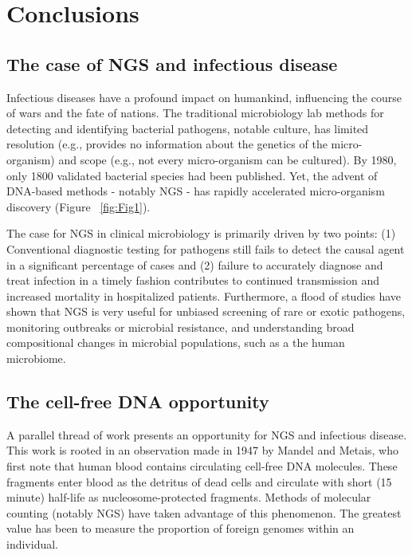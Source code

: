 
\chapter{Conclusions}

\section{The case of NGS and infectious disease}

Infectious diseases have a profound impact on humankind, influencing the course of wars and the fate of nations. The traditional microbiology lab methods for detecting and identifying bacterial pathogens, notable culture, has limited resolution (e.g., provides no information about the genetics of the micro-organism) and scope (e.g., not every micro-organism can be cultured). By 1980, only 1800 validated bacterial species had been published. Yet, the advent of DNA-based methods - notably NGS - has rapidly accelerated micro-organism discovery (Figure ~\ref{fig:Fig1}).

The case for NGS in clinical microbiology is primarily driven by two points: (1) Conventional diagnostic testing for pathogens still fails to detect the causal agent in a significant percentage of cases \cite{Naccache:2014gka} and (2) failure to accurately diagnose and treat infection in a timely fashion contributes to continued transmission and increased mortality in hospitalized patients. Furthermore, a flood of studies have shown that NGS is very useful for unbiased screening of rare or exotic pathogens, monitoring outbreaks or microbial resistance, and understanding broad compositional changes in microbial populations, such as a the human microbiome. 

\section{The cell-free DNA opportunity}

A parallel thread of work presents an opportunity for NGS and infectious disease. This work is rooted in an observation made in 1947 by Mandel and Metais, who first note that human blood contains circulating cell-free DNA molecules. These fragments enter blood as the detritus of dead cells and circulate with short (15 minute) half-life as nucleosome-protected fragments. Methods of molecular counting (notably NGS) have taken advantage of this phenomenon. The greatest value has been to measure the proportion of foreign genomes within an individual.

